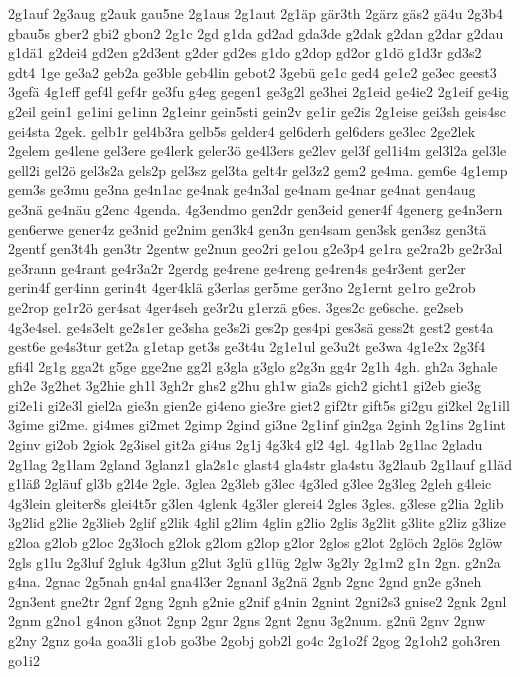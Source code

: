 {2g1auf
2g3aug
g2auk
gau5ne
2g1aus
2g1aut
2g1äp
gär3th
2gärz
gäs2
gä4u
2g3b4
gbau5s
gber2
gbi2
gbon2
2g1c
2gd
g1da
gd2ad
gda3de
g2dak
g2dan
g2dar
g2dau
g1dä1
g2dei4
gd2en
g2d3ent
g2der
gd2es
g1do
g2dop
gd2or
g1dö
g1d3r
gd3s2
gdt4
1ge
ge3a2
geb2a
ge3ble
geb4lin
gebot2
3gebü
ge1c
ged4
ge1e2
ge3ec
geest3
3gefä
4g1eff
gef4l
gef4r
ge3fu
g4eg
gegen1
ge3g2l
ge3hei
2g1eid
ge4ie2
2g1eif
ge4ig
g2eil
gein1
ge1ini
ge1inn
2g1einr
gein5sti
gein2v
ge1ir
ge2is
2g1eise
gei3sh
geis4sc
gei4sta
2gek.
gelb1r
gel4b3ra
gelb5s
gelder4
gel6derh
gel6ders
ge3lec
2ge2lek
2gelem
ge4lene
gel3ere
ge4lerk
geler3ö
ge4l3ers
ge2lev
gel3f
gel1i4m
gel3l2a
gel3le
gell2i
gel2ö
gel3s2a
gels2p
gel3sz
gel3ta
gelt4r
gel3z2
gem2
ge4ma.
gem6e
4g1emp
gem3s
ge3mu
ge3na
ge4n1ac
ge4nak
ge4n3al
ge4nam
ge4nar
ge4nat
gen4aug
ge3nä
ge4näu
g2enc
4genda.
4g3endmo
gen2dr
gen3eid
gener4f
4generg
ge4n3ern
gen6erwe
gener4z
ge3nid
ge2nim
gen3k4
gen3n
gen4sam
gen3sk
gen3sz
gen3tä
2gentf
gen3t4h
gen3tr
2gentw
ge2nun
geo2ri
ge1ou
g2e3p4
ge1ra
ge2ra2b
ge2r3al
ge3rann
ge4rant
ge4r3a2r
2gerdg
ge4rene
ge4reng
ge4ren4s
ge4r3ent
ger2er
gerin4f
ger4inn
gerin4t
4ger4klä
g3erlas
ger5me
ger3no
2g1ernt
ge1ro
ge2rob
ge2rop
ge1r2ö
ger4sat
4ger4seh
ge3r2u
g1erzä
g6es.
3ges2c
ge6sche.
ge2seb
4g3e4sel.
ge4s3elt
ge2s1er
ge3sha
ge3s2i
ges2p
ges4pi
ges3sä
gess2t
gest2
gest4a
gest6e
ge4s3tur
get2a
g1etap
get3s
ge3t4u
2g1e1ul
ge3u2t
ge3wa
4g1e2x
2g3f4
gfi4l
2g1g
gga2t
g5ge
gge2ne
gg2l
g3gla
g3glo
g2g3n
gg4r
2g1h
4gh.
gh2a
3ghale
gh2e
3g2het
3g2hie
gh1l
3gh2r
ghs2
g2hu
gh1w
gia2s
gich2
gicht1
gi2eb
gie3g
gi2e1i
gi2e3l
giel2a
gie3n
gien2e
gi4eno
gie3re
giet2
gif2tr
gift5s
gi2gu
gi2kel
2g1ill
3gime
gi2me.
gi4mes
gi2met
2gimp
2gind
gi3ne
2g1inf
gin2ga
2ginh
2g1ins
2g1int
2ginv
gi2ob
2giok
2g3isel
git2a
gi4us
2g1j
4g3k4
gl2
4gl.
4g1lab
2g1lac
2gladu
2g1lag
2g1lam
2gland
3glanz1
gla2s1c
glast4
gla4str
gla4stu
3g2laub
2g1lauf
g1läd
g1läß
2gläuf
gl3b
g2l4e
2gle.
3glea
2g3leb
g3lec
4g3led
g3lee
2g3leg
2gleh
g4leic
4g3lein
gleiter8s
glei4t5r
g3len
4glenk
4g3ler
glerei4
2gles
3gles.
g3lese
g2lia
2glib
3g2lid
g2lie
2g3lieb
2glif
g2lik
4glil
g2lim
4glin
g2lio
2glis
3g2lit
g3lite
g2liz
g3lize
g2loa
g2lob
g2loc
2g3loch
g2lok
g2lom
g2lop
g2lor
2glos
g2lot
2glöch
2glös
2glöw
2gls
g1lu
2g3luf
2gluk
4g3lun
g2lut
3glü
g1lüg
2glw
3g2ly
2g1m2
g1n
2gn.
g2n2a
g4na.
2gnac
2g5nah
gn4al
gna4l3er
2gnanl
3g2nä
2gnb
2gnc
2gnd
gn2e
g3neh
2gn3ent
gne2tr
2gnf
2gng
2gnh
g2nie
g2nif
g4nin
2gnint
2gni2s3
gnise2
2gnk
2gnl
2gnm
g2no1
g4non
g3not
2gnp
2gnr
2gns
2gnt
2gnu
3g2num.
g2nü
2gnv
2gnw
g2ny
2gnz
go4a
goa3li
g1ob
go3be
2gobj
gob2l
go4c
2g1o2f
2gog
2g1oh2
goh3ren
go1i2
}
